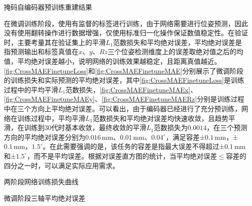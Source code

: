\documentclass{Diploma}
\begin{document}
\begin{subfigures}[MAEPretrain]{掩码自编码器预训练重建结果}
\end{subfigures}

在微调训练阶段，使用有监督的标签进行训练，由于网络需要进行位姿预测，因此没有使用翻转操作进行数据增强，仅使用标准归一化操作保证数值稳定性。在验证时，主要考量其在验证集上的平滑$L_{1}$范数损失和平均绝对误差，平均绝对误差是指预测输出和标签真值在$x$、$y$、$Rz$三个位姿检测维度上的误差取绝对值之后的均值，平均绝对误差越小，说明网络的训练效果越稳定，且距离真值越近。\ref{fig:CrossMAEFinetuneLoss}和\ref{fig:CrossMAEFinetuneMAE}分别展示了微调阶段的训练损失和实际预测的平均绝对误差，其中\ref{fig:CrossMAEFinetuneLoss}是训练过程中的平均平滑$L_{1}$范数损失，\ref{fig:CrossMAEFinetuneMAEx}、\ref{fig:CrossMAEFinetuneMAEy}、\ref{fig:CrossMAEFinetuneMAERz}分别是训练过程中在三个方向上平均绝对误差。可以看出，由于编码器已经进行了充分预训练，网络在训练过程中，平均平滑$L_{1}$范数损失和平均绝对误差均快速收敛，且趋势平滑，在训练到$30$代时基本收敛，最终收敛的平滑$L_{1}$范数损失为$0.0014$，在三个预测方向的平均绝对误差分别为$0.016\,\mathrm{mm}$、$0.01\,\mathrm{mm}$、$0.04^{\circ}$，满足容差±$0.1\,\mathrm{mm}$，±$0.1\,\mathrm{mm}$，$1.5^{\circ}$\cite{yang2024accurate}。在此需要强调的是，该任务的容差是指最大误差不得超过±$0.1\,\mathrm{mm}$和±$1.5^{\circ}$，而不是平均误差。根据对误差直方图的统计，当平均绝对误差$\leq$容差的四分之一时，可以满足实际应用需求。

\begin{subfigures}[TrainLoss]{两阶段网络训练损失曲线}
\end{subfigures}

\begin{subfigures}[CrossMAEFinetuneMAE]{微调阶段三轴平均绝对误差}
\end{subfigures}
\end{document}

